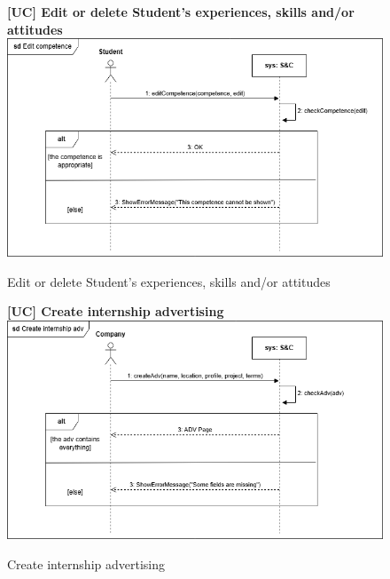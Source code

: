\begin{figure}[H]
\textbf{[UC\nextUCDiagr] Edit or delete Student’s experiences, skills and/or attitudes}\newline\newline
\includegraphics[width=15cm]{Images/UC_diagram/RASD-UC7.drawio.png}
    \caption{Edit or delete Student’s experiences, skills and/or attitudes}
\end{figure}

\begin{figure}[H]
\textbf{[UC\nextUCDiagr] Create internship advertising}\newline\newline
\includegraphics[width=15cm]{Images/UC_diagram/RASD-UC8.drawio.png}
    \caption{Create internship advertising}
\end{figure}

